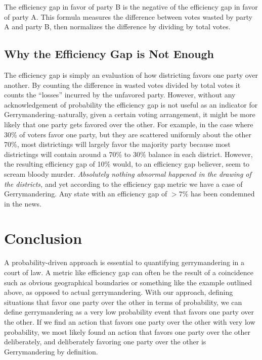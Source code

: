 \documentclass[12pt]{article}
\begin{document}
    The efficiency gap in favor of party B is the negative of the efficiency gap in favor of party A. This formula measures the difference between votes wasted by party A and party B, then normalizes the difference by dividing by total votes.
    
    
    
\subsection{Why the Efficiency Gap is Not Enough}
The efficiency gap is simply an evaluation of how districting favors one party over another. By counting the difference in wasted votes divided by total votes it counts the ``losses'' incurred by the unfavored party. However, without any acknowledgement of probability the efficiency gap is not useful as an indicator for Gerrymandering--naturally, given a certain voting arrangement, it might be more likely that one party gets favored over the other. For example, in the case where 30\% of voters favor one party, but they are scattered uniformly about the other 70\%, most districtings will largely favor the majority party because most districtings will contain around a 70\% to 30\% balance in each district. However, the resulting efficiency gap of 10\% would, to an efficiency gap believer, seem to scream bloody murder. \textit{Absolutely nothing abnormal happened in the drawing of the districts,} and yet according to the efficiency gap metric we have a case of Gerrymandering. Any state with an efficiency gap of $>7\%$ has been condemned in the news.

\section{Conclusion}
A probability-driven approach is essential to quantifying gerrymandering in a court of law. A metric like efficiency gap can often be the result of a coincidence such as obvious geographical boundaries or something like the example outlined above, as opposed to actual gerrymandering. With our approach, defining situations that favor one party over the other in terms of probability, we can define gerrymandering as a very low probability event that favors one party over the other. If we find an action that favors one party over the other with very low probability, we most likely found an action that favors one party over the other deliberately, and deliberately favoring one party over the other is Gerrymandering by definition.
\end{document}
